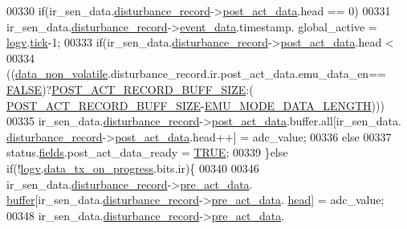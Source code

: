 \begin{DoxyCode}
00330           \textcolor{keywordflow}{if}(ir\_sen\_data.\hyperlink{a00023_ac9b38e2c1d3f1013a88d33506c754152}{disturbance\_record}->\hyperlink{a00028_a9c699c0cc82d0baa6e49195f185ab34f}{post\_act\_data}.head == 0)
00331               ir\_sen\_data.\hyperlink{a00023_ac9b38e2c1d3f1013a88d33506c754152}{disturbance\_record}->\hyperlink{a00028_a8c0bda69e71ef674e60da47ad0be9ab0}{event\_data}.timestamp.
      global\_active = \hyperlink{a00021_a2e89c46668b39a17753c238950c9e1ec}{logv}.\hyperlink{a00021_a81f0ce68c2c483fb8df726cc1988d8e8}{tick}-1;
00333       \textcolor{keywordflow}{if}(ir\_sen\_data.\hyperlink{a00023_ac9b38e2c1d3f1013a88d33506c754152}{disturbance\_record}->\hyperlink{a00028_a9c699c0cc82d0baa6e49195f185ab34f}{post\_act\_data}.head <
00334         ((\hyperlink{a00060_a76ac5f917f5308dcd83de0d7c94559fb}{data\_non\_volatile}.disturbance\_record.ir.post\_act\_data.emu\_data\_en==
      \hyperlink{a00040_aa93f0eb578d23995850d61f7d61c55c1}{FALSE})?\hyperlink{a00022_ab1ad440de86fff80e517ad748de2ee39}{POST\_ACT\_RECORD\_BUFF\_SIZE}:(
      \hyperlink{a00022_ab1ad440de86fff80e517ad748de2ee39}{POST\_ACT\_RECORD\_BUFF\_SIZE}-\hyperlink{a00022_af4c3a8ad94feb4d7bda7f107f34baf41}{EMU\_MODE\_DATA\_LENGTH})))
00335       ir\_sen\_data.\hyperlink{a00023_ac9b38e2c1d3f1013a88d33506c754152}{disturbance\_record}->\hyperlink{a00028_a9c699c0cc82d0baa6e49195f185ab34f}{post\_act\_data}.buffer.all[ir\_sen\_data.
      \hyperlink{a00023_ac9b38e2c1d3f1013a88d33506c754152}{disturbance\_record}->\hyperlink{a00028_a9c699c0cc82d0baa6e49195f185ab34f}{post\_act\_data}.head++] = adc\_value;
00336       \textcolor{keywordflow}{else}
00337       status.\hyperlink{a00021_a5296d090c085b0421fdf5a86e382abea}{fields}.post\_act\_data\_ready = \hyperlink{a00040_aa8cecfc5c5c054d2875c03e77b7be15d}{TRUE};
00339     \}\textcolor{keywordflow}{else} \textcolor{keywordflow}{if}(!\hyperlink{a00021_a2e89c46668b39a17753c238950c9e1ec}{logv}.\hyperlink{a00021_a6cdefde69642ef511e3252c38be68516}{data\_tx\_on\_progress}.bits.ir)\{
00340        
00346     ir\_sen\_data.\hyperlink{a00023_ac9b38e2c1d3f1013a88d33506c754152}{disturbance\_record}->\hyperlink{a00028_aab01e8da056827bc5c9caff9b64c78be}{pre\_act\_data}.
      \hyperlink{a00022_ad611012074e252bf84c1cfb8c273dd79}{buffer}[ir\_sen\_data.\hyperlink{a00023_ac9b38e2c1d3f1013a88d33506c754152}{disturbance\_record}->\hyperlink{a00028_aab01e8da056827bc5c9caff9b64c78be}{pre\_act\_data}.
      \hyperlink{a00022_a15a6827ccabba1c22396eccc1c5c654b}{head}] = adc\_value;
00348     ir\_sen\_data.\hyperlink{a00023_ac9b38e2c1d3f1013a88d33506c754152}{disturbance\_record}->\hyperlink{a00028_aab01e8da056827bc5c9caff9b64c78be}{pre\_act\_data}.

\end{DoxyCode}
